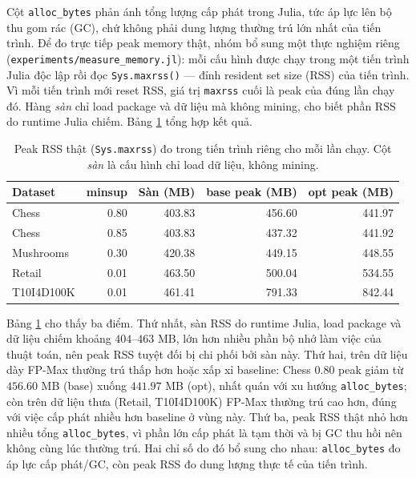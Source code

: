 Cột \texttt{alloc\_bytes} phản ánh tổng lượng cấp phát trong Julia, tức áp lực lên bộ thu gom rác (GC), chứ không phải dung lượng thường trú lớn nhất của tiến trình. Để đo trực tiếp peak memory thật, nhóm bổ sung một thực nghiệm riêng (\texttt{experiments/measure\_memory.jl}): mỗi cấu hình được chạy trong một tiến trình Julia độc lập rồi đọc \texttt{Sys.maxrss()} --- đỉnh resident set size (RSS) của tiến trình. Vì mỗi tiến trình mới reset RSS, giá trị \texttt{maxrss} cuối là peak của đúng lần chạy đó. Hàng \emph{sàn} chỉ load package và dữ liệu mà không mining, cho biết phần RSS do runtime Julia chiếm. Bảng \ref{tab:peak-rss} tổng hợp kết quả.

\begin{table}[H]
    \centering
    \caption{Peak RSS thật (\texttt{Sys.maxrss}) đo trong tiến trình riêng cho mỗi lần chạy. Cột \emph{sàn} là cấu hình chỉ load dữ liệu, không mining.}
    \label{tab:peak-rss}
    \begin{tabular}{l r r r r}
        \toprule
        Dataset & minsup & Sàn (MB) & base peak (MB) & opt peak (MB) \\
        \midrule
        Chess      & 0.80 & 403.83 & 456.60 & 441.97 \\
        Chess      & 0.85 & 403.83 & 437.32 & 441.92 \\
        Mushrooms  & 0.30 & 420.38 & 449.15 & 448.55 \\
        Retail     & 0.01 & 463.50 & 500.04 & 534.55 \\
        T10I4D100K & 0.01 & 461.41 & 791.33 & 842.44 \\
        \bottomrule
    \end{tabular}
\end{table}

Bảng \ref{tab:peak-rss} cho thấy ba điểm. Thứ nhất, sàn RSS do runtime Julia, load package và dữ liệu chiếm khoảng $404$--$463$ MB, lớn hơn nhiều phần bộ nhớ làm việc của thuật toán, nên peak RSS tuyệt đối bị chi phối bởi sàn này. Thứ hai, trên dữ liệu dày FP-Max thường trú thấp hơn hoặc xấp xỉ baseline: Chess $0.80$ peak giảm từ $456.60$ MB (base) xuống $441.97$ MB (opt), nhất quán với xu hướng \texttt{alloc\_bytes}; còn trên dữ liệu thưa (Retail, T10I4D100K) FP-Max thường trú cao hơn, đúng với việc cấp phát nhiều hơn baseline ở vùng này. Thứ ba, peak RSS thật nhỏ hơn nhiều tổng \texttt{alloc\_bytes}, vì phần lớn cấp phát là tạm thời và bị GC thu hồi nên không cùng lúc thường trú. Hai chỉ số do đó bổ sung cho nhau: \texttt{alloc\_bytes} đo áp lực cấp phát/GC, còn peak RSS đo dung lượng thực tế của tiến trình.

